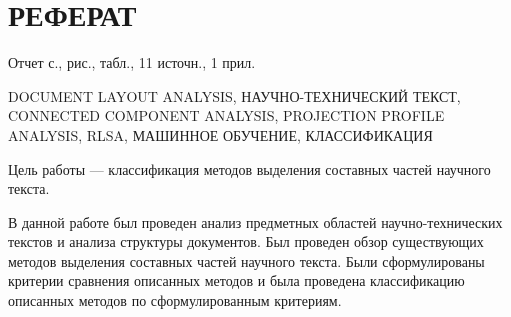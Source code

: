 \section*{РЕФЕРАТ}

Отчет \pageref{LastPage} с.,  рис.,  табл., 11 источн., 1 прил.

DOCUMENT LAYOUT ANALYSIS,
НАУЧНО-ТЕХНИЧЕСКИЙ ТЕКСТ,
CONNECTED COMPONENT ANALYSIS,
PROJECTION PROFILE ANALYSIS,
RLSA,
МАШИННОЕ ОБУЧЕНИЕ,
КЛАССИФИКАЦИЯ

Цель работы --- классификация методов выделения составных частей научного текста.

В данной работе был проведен анализ предметных областей научно-технических текстов и анализа структуры документов.
Был проведен обзор существующих методов выделения составных частей научного текста.
Были сформулированы критерии сравнения описанных методов и была проведена классификацию описанных методов по сформулированным критериям.
